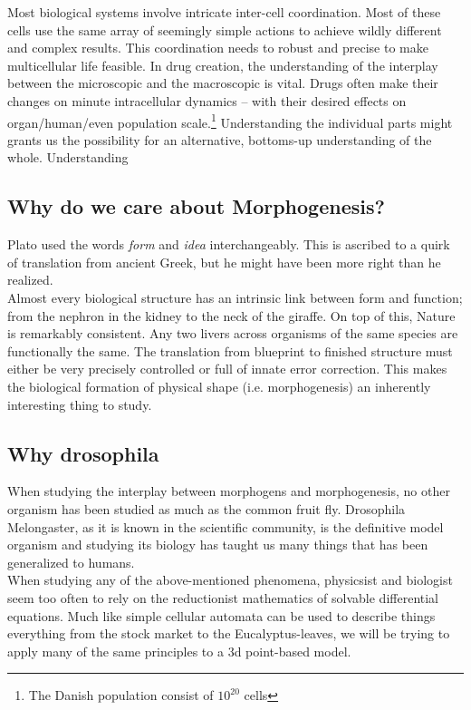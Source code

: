 Most biological systems involve intricate inter-cell coordination. Most of these cells use the same array of seemingly simple actions to achieve wildly different and complex results. This coordination needs to robust and precise to make multicellular life feasible. In drug creation, the understanding of the interplay between the microscopic and the macroscopic is vital. Drugs often make their changes on minute intracellular dynamics -- with their desired effects on organ/human/even population scale.\footnote{The Danish population consist of $10^{20}$ cells}
Understanding the individual parts might grants us the possibility for an alternative, bottoms-up understanding of the whole. Understanding  

\subsection{Why do we care about Morphogenesis?}
Plato used the words \textit{form} and \textit{idea} interchangeably. This is ascribed to a quirk of translation from ancient Greek, but he might have been more right than he realized.\\ Almost every biological structure has an intrinsic link between form and function; from the nephron in the kidney to the neck of the giraffe.  
On top of this, Nature is remarkably consistent. Any two livers across organisms of the same species are functionally the same. The translation from blueprint to finished structure must either be very precisely controlled or full of innate error correction. This makes the biological formation of physical shape (i.e. morphogenesis) an inherently interesting thing to study. 

\subsection{Why drosophila}
When studying the interplay between morphogens and morphogenesis, no other organism has been studied as much as the common fruit fly. Drosophila Melongaster, as it is known in the scientific community, is the definitive model organism and studying its biology has taught us many things that has been generalized to humans. \\


When studying any of the above-mentioned phenomena, physicsist and biologist seem too often to rely on the reductionist mathematics of solvable differential equations. Much like simple cellular automata can be used to describe things everything from the stock market to the Eucalyptus-leaves, we will be trying to apply many of the same principles to a 3d point-based model.

